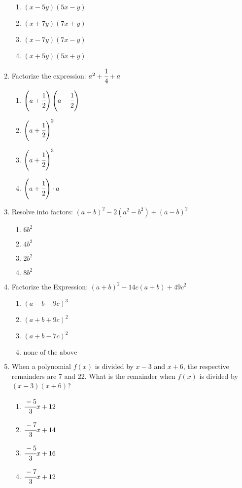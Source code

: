 \begin{multicols}{2}
\begin{enumerate}[label={\arabic*.}]
\begin{enumerate}[label={\Alph*.}]
	\item \((x-5y)(5x -y)\)
	\item \((x+7y)(7x + y)\)
	\item \((x-7y)(7x-y)\)
	\item \((x+5y)(5x + y)\)
	\end{enumerate}
\item Factorize the expression: $a^2 + \cfrac{1}{4} + a$
\begin{multicols}{2}
	\begin{enumerate}[label={\Alph*.}]
	\item \(\left(a+ \cfrac{1}{2}\right) \left(a - \cfrac{1}{2}\right) \)
	\item \(\left(a+ \cfrac{1}{2}\right)^2\)
	\item \(\left(a+\cfrac{1}{2}\right)^3\)
	\item \(\left(a+ \cfrac{1}{2}\right)\cdot a\)
\end{enumerate}
\end{multicols}
\item Resolve into factors: $(a+b)^2 - 2(a^2 - b^2) + (a-b)^2$
	\begin{enumerate}[label={\Alph*.}]
	\item \(6b^2\)
	\item \(4b^2\)
	\item \(2b^2\)
	\item \(8b^2\)
	\end{enumerate}
\item Factorize the Expression: $(a+b)^2 - 14c(a+b) + 49c^2$
	\begin{enumerate}[label={\Alph*.}]
	\item \((a-b-9c)^3\)
	\item \((a+b+9c)^2\)
	\item \((a+b-7c)^2\)
	\item \(\text{none of the above}\)
	\end{enumerate}
\item When a polynomial $f(x)$ is divided by $x-3$ and $x+6$, the respective remainders are 7 and 22. What is the remainder when $f(x)$ is divided by $(x-3)(x+6)$?
	\begin{enumerate}[label={\Alph*.}]
	\item \(\cfrac{-5}{3}x + 12\)
	\item \(\cfrac{-7}{3}x + 14\)
	\item \(\cfrac{-5}{3}x + 16\)
	\item \(\cfrac{-7}{3}x + 12\)
	\end{enumerate}

\end{enumerate}
\end{multicols}
